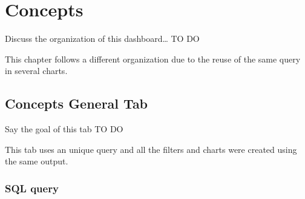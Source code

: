 \documentclass[]{book}
\begin{document}
\chapter{Concepts}\label{concepts}

Discuss the organization of this dashboard\ldots{} TO DO

This chapter follows a different organization due to the reuse of the
same query in several charts.

\section{Concepts General Tab}\label{concepts-general-tab}

Say the goal of this tab TO DO

This tab uses an unique query and all the filters and charts were
created using the same output.

\subsection{SQL query}\label{sql-query-16}
\end{document}
